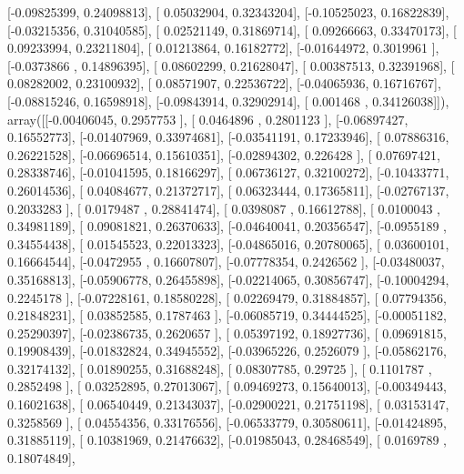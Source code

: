 \documentclass{article}
\begin{document}
       [-0.09825399,  0.24098813],
       [ 0.05032904,  0.32343204],
       [-0.10525023,  0.16822839],
       [-0.03215356,  0.31040585],
       [ 0.02521149,  0.31869714],
       [ 0.09266663,  0.33470173],
       [ 0.09233994,  0.23211804],
       [ 0.01213864,  0.16182772],
       [-0.01644972,  0.3019961 ],
       [-0.0373866 ,  0.14896395],
       [ 0.08602299,  0.21628047],
       [ 0.00387513,  0.32391968],
       [ 0.08282002,  0.23100932],
       [ 0.08571907,  0.22536722],
       [-0.04065936,  0.16716767],
       [-0.08815246,  0.16598918],
       [-0.09843914,  0.32902914],
       [ 0.001468  ,  0.34126038]]), array([[-0.00406045,  0.2957753 ],
       [ 0.0464896 ,  0.2801123 ],
       [-0.06897427,  0.16552773],
       [-0.01407969,  0.33974681],
       [-0.03541191,  0.17233946],
       [ 0.07886316,  0.26221528],
       [-0.06696514,  0.15610351],
       [-0.02894302,  0.226428  ],
       [ 0.07697421,  0.28338746],
       [-0.01041595,  0.18166297],
       [ 0.06736127,  0.32100272],
       [-0.10433771,  0.26014536],
       [ 0.04084677,  0.21372717],
       [ 0.06323444,  0.17365811],
       [-0.02767137,  0.2033283 ],
       [ 0.0179487 ,  0.28841474],
       [ 0.0398087 ,  0.16612788],
       [ 0.0100043 ,  0.34981189],
       [ 0.09081821,  0.26370633],
       [-0.04640041,  0.20356547],
       [-0.0955189 ,  0.34554438],
       [ 0.01545523,  0.22013323],
       [-0.04865016,  0.20780065],
       [ 0.03600101,  0.16664544],
       [-0.0472955 ,  0.16607807],
       [-0.07778354,  0.2426562 ],
       [-0.03480037,  0.35168813],
       [-0.05906778,  0.26455898],
       [-0.02214065,  0.30856747],
       [-0.10004294,  0.2245178 ],
       [-0.07228161,  0.18580228],
       [ 0.02269479,  0.31884857],
       [ 0.07794356,  0.21848231],
       [ 0.03852585,  0.1787463 ],
       [-0.06085719,  0.34444525],
       [-0.00051182,  0.25290397],
       [-0.02386735,  0.2620657 ],
       [ 0.05397192,  0.18927736],
       [ 0.09691815,  0.19908439],
       [-0.01832824,  0.34945552],
       [-0.03965226,  0.2526079 ],
       [-0.05862176,  0.32174132],
       [ 0.01890255,  0.31688248],
       [ 0.08307785,  0.29725   ],
       [ 0.1101787 ,  0.2852498 ],
       [ 0.03252895,  0.27013067],
       [ 0.09469273,  0.15640013],
       [-0.00349443,  0.16021638],
       [ 0.06540449,  0.21343037],
       [-0.02900221,  0.21751198],
       [ 0.03153147,  0.3258569 ],
       [ 0.04554356,  0.33176556],
       [-0.06533779,  0.30580611],
       [-0.01424895,  0.31885119],
       [ 0.10381969,  0.21476632],
       [-0.01985043,  0.28468549],
       [ 0.0169789 ,  0.18074849],
\end{document}
